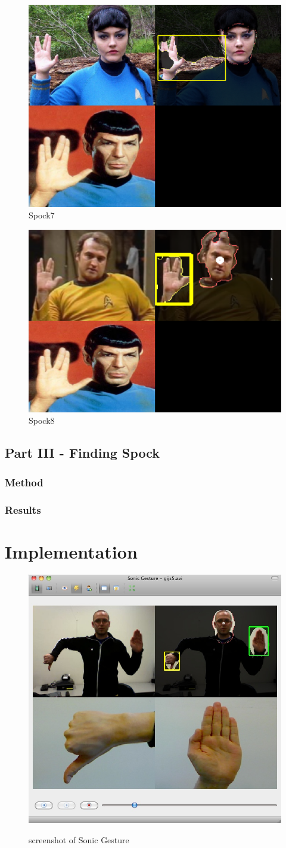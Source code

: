 \begin{figure}[htbp]
	\center{}
	\includegraphics[width=0.3\linewidth]{figures/spock7.png}
	\caption{Spock7}
	\label{fig:spock7}
\end{figure}


\begin{figure}[htbp]
	\center{}
	\includegraphics[width=0.3\linewidth]{figures/spock8.png}
	\caption{Spock8}
	\label{fig:spock8}
\end{figure}


\subsection{Part III - Finding Spock}

\subsubsection{Method}
\subsubsection{Results}




\section{Implementation}
\label{sec:implementation}

\begin{figure}[ht]
\begin{center}
\label{fig:sonicgesture}
\includegraphics[width=0.6\linewidth]{figures/sonicgesture.jpg}
\end{center}
\caption{screenshot of Sonic Gesture}
\end{figure}


